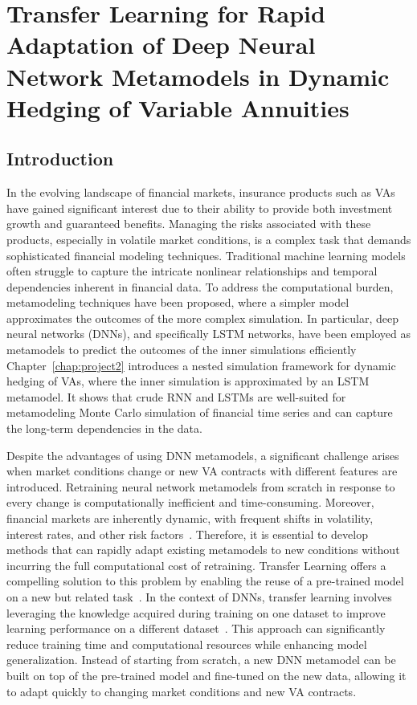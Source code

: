 \chapter{Transfer Learning for Rapid Adaptation of Deep Neural Network Metamodels in Dynamic Hedging of Variable Annuities} \label{chap:project3}

\section{Introduction}

In the evolving landscape of financial markets, insurance products such as VAs have gained significant interest due to their ability to provide both investment growth and guaranteed benefits. 
Managing the risks associated with these products, especially in volatile market conditions, is a complex task that demands sophisticated financial modeling techniques. 
Traditional machine learning models often struggle to capture the intricate nonlinear relationships and temporal dependencies inherent in financial data.
To address the computational burden, metamodeling techniques have been proposed, where a simpler model approximates the outcomes of the more complex simulation. 
In particular, deep neural networks (DNNs), and specifically LSTM networks, have been employed as metamodels to predict the outcomes of the inner simulations efficiently
Chapter~\ref{chap:project2} introduces a nested simulation framework for dynamic hedging of VAs, where the inner simulation is approximated by an LSTM metamodel.
It shows that crude RNN and LSTMs are well-suited for metamodeling Monte Carlo simulation of financial time series and can capture the long-term dependencies in the data.

Despite the advantages of using DNN metamodels, a significant challenge arises when market conditions change or new VA contracts with different features are introduced. 
Retraining neural network metamodels from scratch in response to every change is computationally inefficient and time-consuming.
Moreover, financial markets are inherently dynamic, with frequent shifts in volatility, interest rates, and other risk factors~\citep{cont2001empirical}.
Therefore, it is essential to develop methods that can rapidly adapt existing metamodels to new conditions without incurring the full computational cost of retraining.
Transfer Learning offers a compelling solution to this problem by enabling the reuse of a pre-trained model on a new but related task~\citep{pan2009survey}.
In the context of DNNs, transfer learning involves leveraging the knowledge acquired during training on one dataset to improve learning performance on a different dataset~\citep{yosinski2014transferable}.
This approach can significantly reduce training time and computational resources while enhancing model generalization.
Instead of starting from scratch, a new DNN metamodel can be built on top of the pre-trained model and fine-tuned on the new data, allowing it to adapt quickly to changing market conditions and new VA contracts.

